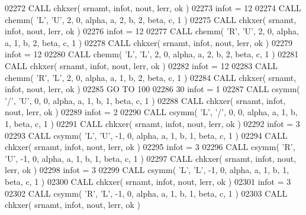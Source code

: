 \begin{DoxyCode}
02272       \textcolor{keyword}{CALL }chkxer( srnamt, infot, nout, lerr, ok )
02273       infot = 12
02274       \textcolor{keyword}{CALL }chemm( \textcolor{stringliteral}{'L'}, \textcolor{stringliteral}{'U'}, 2, 0, alpha, a, 2, b, 2, beta, c, 1 )
02275       \textcolor{keyword}{CALL }chkxer( srnamt, infot, nout, lerr, ok )
02276       infot = 12
02277       \textcolor{keyword}{CALL }chemm( \textcolor{stringliteral}{'R'}, \textcolor{stringliteral}{'U'}, 2, 0, alpha, a, 1, b, 2, beta, c, 1 )
02278       \textcolor{keyword}{CALL }chkxer( srnamt, infot, nout, lerr, ok )
02279       infot = 12
02280       \textcolor{keyword}{CALL }chemm( \textcolor{stringliteral}{'L'}, \textcolor{stringliteral}{'L'}, 2, 0, alpha, a, 2, b, 2, beta, c, 1 )
02281       \textcolor{keyword}{CALL }chkxer( srnamt, infot, nout, lerr, ok )
02282       infot = 12
02283       \textcolor{keyword}{CALL }chemm( \textcolor{stringliteral}{'R'}, \textcolor{stringliteral}{'L'}, 2, 0, alpha, a, 1, b, 2, beta, c, 1 )
02284       \textcolor{keyword}{CALL }chkxer( srnamt, infot, nout, lerr, ok )
02285       \textcolor{keywordflow}{GO TO} 100
02286    30 infot = 1
02287       \textcolor{keyword}{CALL }csymm( \textcolor{stringliteral}{'/'}, \textcolor{stringliteral}{'U'}, 0, 0, alpha, a, 1, b, 1, beta, c, 1 )
02288       \textcolor{keyword}{CALL }chkxer( srnamt, infot, nout, lerr, ok )
02289       infot = 2
02290       \textcolor{keyword}{CALL }csymm( \textcolor{stringliteral}{'L'}, \textcolor{stringliteral}{'/'}, 0, 0, alpha, a, 1, b, 1, beta, c, 1 )
02291       \textcolor{keyword}{CALL }chkxer( srnamt, infot, nout, lerr, ok )
02292       infot = 3
02293       \textcolor{keyword}{CALL }csymm( \textcolor{stringliteral}{'L'}, \textcolor{stringliteral}{'U'}, -1, 0, alpha, a, 1, b, 1, beta, c, 1 )
02294       \textcolor{keyword}{CALL }chkxer( srnamt, infot, nout, lerr, ok )
02295       infot = 3
02296       \textcolor{keyword}{CALL }csymm( \textcolor{stringliteral}{'R'}, \textcolor{stringliteral}{'U'}, -1, 0, alpha, a, 1, b, 1, beta, c, 1 )
02297       \textcolor{keyword}{CALL }chkxer( srnamt, infot, nout, lerr, ok )
02298       infot = 3
02299       \textcolor{keyword}{CALL }csymm( \textcolor{stringliteral}{'L'}, \textcolor{stringliteral}{'L'}, -1, 0, alpha, a, 1, b, 1, beta, c, 1 )
02300       \textcolor{keyword}{CALL }chkxer( srnamt, infot, nout, lerr, ok )
02301       infot = 3
02302       \textcolor{keyword}{CALL }csymm( \textcolor{stringliteral}{'R'}, \textcolor{stringliteral}{'L'}, -1, 0, alpha, a, 1, b, 1, beta, c, 1 )
02303       \textcolor{keyword}{CALL }chkxer( srnamt, infot, nout, lerr, ok )

\end{DoxyCode}
